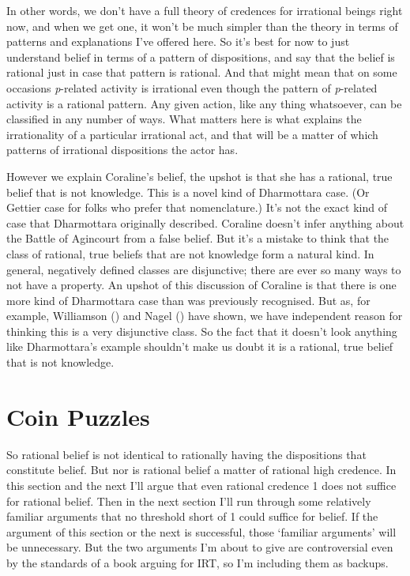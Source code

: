 \documentclass[
  10pt,
  letterpaper,
  twoside]{scrbook}
\begin{document}
In other words, we don't have a full theory of credences for irrational
beings right now, and when we get one, it won't be much simpler than the
theory in terms of patterns and explanations I've offered here. So it's
best for now to just understand belief in terms of a pattern of
dispositions, and say that the belief is rational just in case that
pattern is rational. And that might mean that on some occasions
\emph{p}-related activity is irrational even though the pattern of
\emph{p}-related activity is a rational pattern. Any given action, like
any thing whatsoever, can be classified in any number of ways. What
matters here is what explains the irrationality of a particular
irrational act, and that will be a matter of which patterns of
irrational dispositions the actor has.

However we explain Coraline's belief, the upshot is that she has a
rational, true belief that is not knowledge. This is a novel kind of
Dharmottara case. (Or Gettier case for folks who prefer that
nomenclature.) It's not the exact kind of case that Dharmottara
originally described. Coraline doesn't infer anything about the Battle
of Agincourt from a false belief. But it's a mistake to think that the
class of rational, true beliefs that are not knowledge form a natural
kind. In general, negatively defined classes are disjunctive; there are
ever so many ways to not have a property. An upshot of this discussion
of Coraline is that there is one more kind of Dharmottara case than was
previously recognised. But as, for example, Williamson
() and Nagel
() have shown, we have
independent reason for thinking this is a very disjunctive class. So the
fact that it doesn't look anything like Dharmottara's example shouldn't
make us doubt it is a rational, true belief that is not knowledge.

\section{Coin Puzzles}\label{sec-lockecoin}

So rational belief is not identical to rationally having the
dispositions that constitute belief. But nor is rational belief a matter
of rational high credence. In this section and the next I'll argue that
even rational credence 1 does not suffice for rational belief. Then in
the next section I'll run through some relatively familiar arguments
that no threshold short of 1 could suffice for belief. If the argument
of this section or the next is successful, those `familiar arguments'
will be unnecessary. But the two arguments I'm about to give are
controversial even by the standards of a book arguing for IRT, so I'm
including them as backups.
\end{document}
